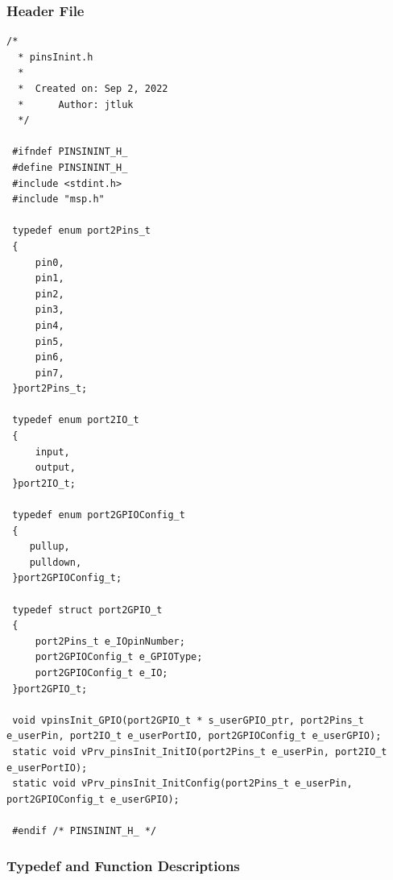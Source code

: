 \documentclass[11pt,a4paper]{article}
\begin{document}
\subsubsection{Header File}
\begin{lstlisting}[style=CStyle]
  /*
  * pinsInint.h
  *
  *  Created on: Sep 2, 2022
  *      Author: jtluk
  */
 
 #ifndef PINSININT_H_
 #define PINSININT_H_
 #include <stdint.h>
 #include "msp.h"
 
 typedef enum port2Pins_t
 {
     pin0,
     pin1,
     pin2,
     pin3,
     pin4,
     pin5,
     pin6,
     pin7,
 }port2Pins_t;
 
 typedef enum port2IO_t
 {
     input,
     output,
 }port2IO_t;
 
 typedef enum port2GPIOConfig_t
 {
    pullup,
    pulldown,
 }port2GPIOConfig_t;
 
 typedef struct port2GPIO_t
 {
     port2Pins_t e_IOpinNumber;
     port2GPIOConfig_t e_GPIOType;
     port2GPIOConfig_t e_IO;
 }port2GPIO_t;
 
 void vpinsInit_GPIO(port2GPIO_t * s_userGPIO_ptr, port2Pins_t e_userPin, port2IO_t e_userPortIO, port2GPIOConfig_t e_userGPIO);
 static void vPrv_pinsInit_InitIO(port2Pins_t e_userPin, port2IO_t e_userPortIO);
 static void vPrv_pinsInit_InitConfig(port2Pins_t e_userPin, port2GPIOConfig_t e_userGPIO);
 
 #endif /* PINSININT_H_ */ 
\end{lstlisting}

\subsubsection{Typedef and Function Descriptions}
\end{document}
